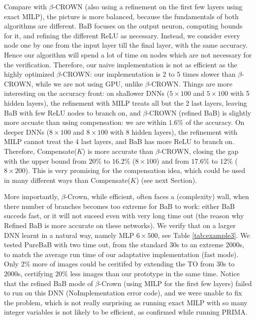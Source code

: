 \documentclass{llncs}
\begin{document}
Compare with $\beta$-CROWN (also using a refinement on the first few layers using exact MILP), 
the picture is more balanced, because the fundamentals of both algorithms are different. BaB 
focuses on the output neuron, computing bounds for it, and refining the different ReLU as necessary. 
Instead, we consider every node one by one from the input layer till the final layer, with the same accuracy. Hence our algorithm will spend a lot of time on nodes which are not necessary for the verification. Therefore, our naive implementation is not as efficient as the highly optimized
$\beta$-CROWN: our implementation is 2 to 5 times slower than $\beta$-CROWN, while we are not using GPU, unlike $\beta$-CROWN. Things are more interesting on the accuracy front: on shallower DNNs ($5 \times 100$ and $5 \times 100$ with 5 hidden layers), the refinement with MILP treats all but the 2 last layers, 
leaving BaB with few ReLU nodes to branch on, and $\beta$-CROWN (refined BaB) is slightly more accuate than using compensation: we are within $1.6\%$ of the accuracy. On deeper DNNs ($8 \times 100$ and $8 \times 100$ with 8 hidden layers), the refinement with MILP cannot treat the 4 last layers, and BaB has more ReLU to branch on. Therefore, Compensate($K$) is more accurate than $\beta$-CROWN, 
closing the gap with the upper bound from $20\%$ to $16.2\%$ ($8 \times 100$)
and from $17.6\%$ to $12\%$ ($8 \times 200$). This is very promising for the compensation idea, which could be used in many different ways than Compensate($K$) (see next Section).
 

More importantly, $\beta$-Crown, while efficient, often faces a (complexity) wall, when there number of branches becomes too extreme for BaB to work: either BaB succeds fast, or it will not suceed even with very long time out (the reason why Refined BaB is more accurate on these networks). We verify that on a larger DNN learnt in a natural way, namely MLP $6 \times 500$, see Table \ref{tab:example3}.
We tested PureBaB with two time out, from the standard 30s to an extreme 2000s, to match the average run time of our adaptative implementation (fast mode). Only $2\%$ more of images could be ceritifed by extending the TO from 30s to 2000s, certifying $20\%$ less images than our prototype in the same time.
Notice that the refined BaB mode of $\beta$-Crown (using MILP for the first few layers) failed to run on this DNN (NoImplementation error code), and we were unable to fix the problem, which is not really surprising as running exact MILP with so many integer variables is not likely to be efficient, as 
confirmed while running PRIMA.
\end{document}
